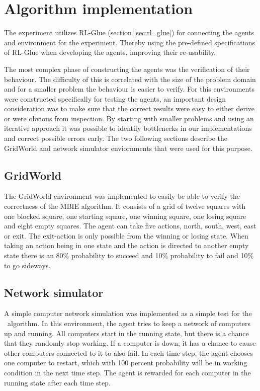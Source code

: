 \section{Algorithm implementation}
\label{sec:implementation}

The experiment utilizes RL-Glue (section \ref{sec:rl_glue}) for connecting the
agents and environment for the experiment. Thereby using the pre-defined
specifications of RL-Glue when developing the agents, improving their
re-usability. 

The most complex phase of constructing the agents was the verification of their
behaviour. The difficulty of this is correlated with the size of the problem
domain and for a smaller problem the behaviour is easier to verify. For this 
environments were constructed specifically for testing the agents, an
important design consideration was to make sure that the correct results were
easy to either derive or were obvious from inspection. By starting with smaller
problems and using an iterative approach it was possible to identify
bottlenecks in our implementations and correct possible errors early. The two
following sections describe the GridWorld and network simulator enviornments
that were used for this purpose. 

\subsection{GridWorld}

The GridWorld environment was implemented to easily be able to verify the
correctness of the MBIE algorithm. It consists of a grid of twelve squares with
one blocked square, one starting square, one winning square, one losing square and
eight empty squares. The agent can take five actions, north, south, west,
east or exit. The exit-action is only possible from the winning or losing
state. When taking an action being in one state and the action is directed to
another empty state there is an 80\% probability to succeed and 10\%
probability to fail and 10\% to go sideways.

\subsection{Network simulator}

A simple computer network simulation was implemented as a simple test for
the \etre\ algorithm. In this environment, the agent tries to keep a network of
computers up and running. All computers start in the running state, but there
is a chance that they randomly stop working. If a computer is down, it has a
chance to cause other computers connected to it to also fail. In each time
step, the agent chooses one computer to restart, which with 100 percent
probability will be in working condition in the next time step. The agent is
rewarded for each computer in the running state after each time step. 
